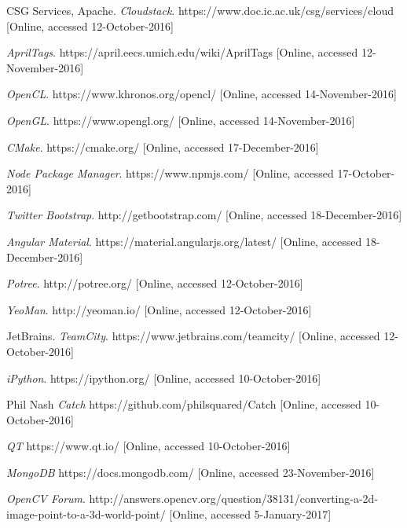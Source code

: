 \documentclass{article}
\begin{document}
\begin{thebibliography}{9}
  CSG Services, Apache.
  \emph{Cloudstack}.
  https://www.doc.ic.ac.uk/csg/services/cloud [Online, accessed 12-October-2016]
  
  \emph{AprilTags}.
  https://april.eecs.umich.edu/wiki/AprilTags [Online, accessed 12-November-2016]
  
  \emph{OpenCL}.
  https://www.khronos.org/opencl/ [Online, accessed 14-November-2016]
  
  \emph{OpenGL}.
  https://www.opengl.org/ [Online, accessed 14-November-2016]
  
  \emph{CMake}.
  https://cmake.org/ [Online, accessed 17-December-2016]
  
  \emph{Node Package Manager}.
  https://www.npmjs.com/ [Online, accessed 17-October-2016]
  
  \emph{Twitter Bootstrap}.
  http://getbootstrap.com/ [Online, accessed 18-December-2016]
  
  \emph{Angular Material}.
  https://material.angularjs.org/latest/ [Online, accessed 18-December-2016]
  
  \emph{Potree}.
  http://potree.org/ [Online, accessed 12-October-2016]

  \emph{YeoMan}.
  http://yeoman.io/ [Online, accessed 12-October-2016]

  JetBrains.
  \emph{TeamCity}.
  https://www.jetbrains.com/teamcity/ [Online, accessed 12-October-2016]
  
  \emph{iPython}.
  https://ipython.org/ [Online, accessed 10-October-2016]
  
  Phil Nash
  \emph{Catch}
  https://github.com/philsquared/Catch [Online, accessed 10-October-2016]
  
  \emph{QT}
  https://www.qt.io/ [Online, accessed 10-October-2016]
  
  \emph{MongoDB}
  https://docs.mongodb.com/ [Online, accessed 23-November-2016]
  
  \emph{OpenCV Forum}.
  http://answers.opencv.org/question/38131/converting-a-2d-image-point-to-a-3d-world-point/ [Online, accessed 5-January-2017]

\end{thebibliography}
\end{document}
